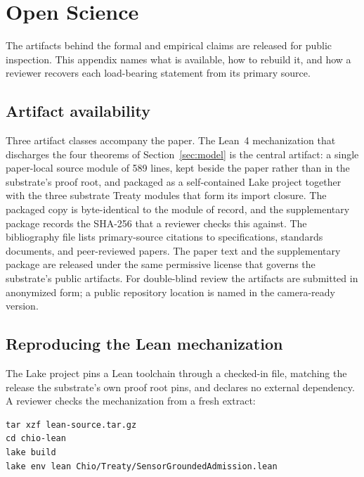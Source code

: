 \section{Open Science}
\label{sec:open-science}

The artifacts behind the formal and empirical claims are released for
public inspection. This appendix names what is available, how to
rebuild it, and how a reviewer recovers each load-bearing statement
from its primary source.

\subsection{Artifact availability}
\label{sec:open-science:availability}

Three artifact classes accompany the paper. The Lean~4 mechanization
that discharges the four theorems of Section~\ref{sec:model} is the
central artifact: a single paper-local source module of 589 lines,
kept beside the paper rather than in the substrate's proof root, and
packaged as a self-contained Lake project together with the three
substrate Treaty modules that form its import closure. The packaged
copy is byte-identical to the module of record, and the supplementary
package records the SHA-256 that a reviewer checks this against. The
bibliography file lists primary-source
citations to specifications, standards documents, and peer-reviewed
papers. The paper text and the supplementary package are released under
the same permissive license that governs the substrate's public
artifacts. For double-blind review the artifacts are submitted in
anonymized form; a public repository location is named in the
camera-ready version.

\subsection{Reproducing the Lean mechanization}
\label{sec:open-science:lean}

The Lake project pins a Lean toolchain through a checked-in
 file, matching the release the substrate's own
proof root pins, and declares no external dependency. A reviewer checks
the mechanization from a fresh extract:

\begin{verbatim}
tar xzf lean-source.tar.gz
cd chio-lean
lake build
lake env lean Chio/Treaty/SensorGroundedAdmission.lean
\end{verbatim}

